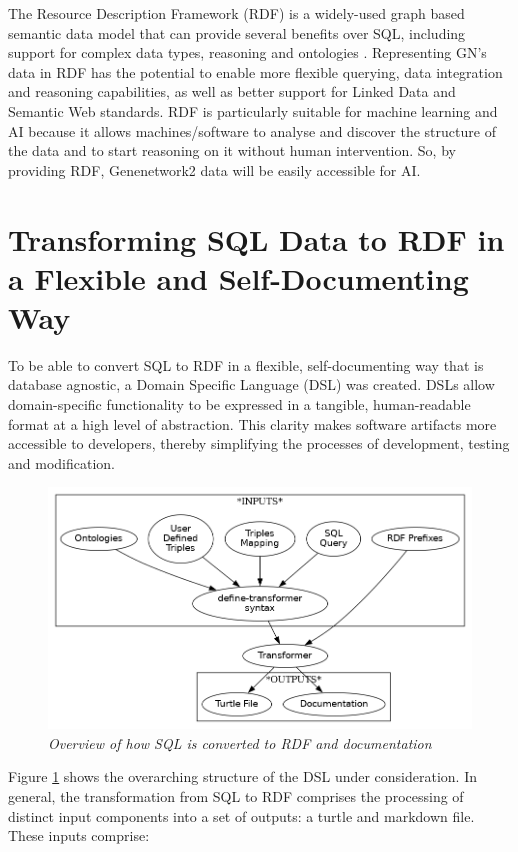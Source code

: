 \documentclass{article}
\begin{document}
The Resource Description Framework (RDF) is a widely-used graph based semantic data model that can provide several benefits over SQL, including support for complex data types, reasoning and ontologies \cite{allemang2011semantic}\cite{candan2001resource}.  Representing GN's data in RDF has the potential to enable more flexible querying, data integration and reasoning capabilities, as well as better support for Linked Data and Semantic Web standards.  RDF is particularly suitable for machine learning and AI because it allows machines/software to analyse and discover the structure of the data and to start reasoning on it without human intervention.  So, by providing RDF, Genenetwork2 data will be easily accessible for AI.

\section{Transforming SQL Data to RDF in a Flexible and Self-Documenting Way}

To be able to convert SQL to RDF in a flexible, self-documenting way that is database agnostic, a Domain Specific Language (DSL) was created.  DSLs allow domain-specific functionality to be expressed in a tangible, human-readable format at a high level of abstraction.  This clarity makes software artifacts more accessible to developers, thereby simplifying the processes of development, testing and modification.

\begin{figure}[h]
  \centering
  \includegraphics[width=0.7\linewidth]{systemDesign}
  \caption{\textit{Overview of how SQL is converted to RDF and documentation}}
  \label{fig:system-diagram}
  \centering
\end{figure}

Figure \ref{fig:system-diagram} shows the overarching structure of the DSL under consideration.  In general, the transformation from SQL to RDF comprises the processing of distinct input components into a set of outputs: a turtle and markdown file.  These inputs comprise:
\end{document}
